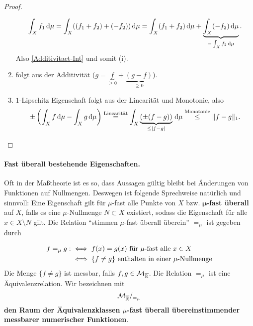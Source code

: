 \begin{satz}
\begin{proof}
\begin{enumerate}
\begin{equation*}
\begin{split}
\int_X f_1 \, \mathrm{d} \mu = \int_X ((f_1+f_2)+(-f_2))\, \mathrm{d}\mu = \int_X (f_1+f_2)\, \mathrm{d}\mu+ \underbrace{\int_X(-f_2)\, \mathrm{d}\mu}_{-\int_X f_2\, \mathrm{d}\mu}.
\end{split}
\end{equation*}
Also \eqref{Additivitaet-Int} und somit (i).
\item folgt aus der Additivität ($g=\underbrace{f}_{\geq 0}+\underbrace{(g-f)}_{\geq 0}$).
\item $1$-Lipschitz Eigenschaft folgt aus der Linearität und Monotonie, also
$$
\pm\left(
\int_Xf\, \mathrm{d}\mu-\int_Xg\, \mathrm{d}\mu
\right) \overset{\text{Linearität}}= \int_X\underbrace{(\pm(f-g))}_{\leq |f-g|}\, \mathrm{d}\mu\overset{\text{Monotonie}}\leq \|f-g\|_1.
$$
\end{enumerate}
\end{proof}
\end{satz}
\paragraph{Fast überall bestehende Eigenschaften.} Oft in der Maßtheorie ist es so, dass Aussagen gültig bleibt bei Änderungen von Funktionen auf Nullmengen. Deswegen ist folgende Sprechweise natürlich und sinnvoll: Eine Eigenschaft gilt für $\mu$-fast alle Punkte von $X$ bzw. $\boldsymbol\mu$\textbf{-fast überall} auf $X$, falls es eine $\mu$-Nullmenge $N\subset X$ existiert, sodass die Eigenschaft für alle $x\in X\setminus N$ gilt. Die Relation ``stimmen $\mu$-fast überall überein'' $=_\mu$ ist gegeben durch

\begin{equation*}
\begin{split}
f =_\mu g : &\iff f(x)=g(x) \  \text{für }\mu \text{-fast alle } x \in X 
\\ &\iff \{f\neq g\} \text{ enthalten in einer } \mu\text{-Nullmenge}
\end{split}
\end{equation*}
Die Menge $\{f\neq g\}$ ist messbar, falls $f,g \in \mathcal{M}_{\overline{\mathbb{R}}}$. Die Relation $=_\mu$ ist eine Äquivalenzrelation. Wir bezeichnen mit $$\mathcal{M}_{\overline{\mathbb{R}}}/_{=_\mu}$$ \textbf{den Raum der Äquivalenzklassen $\mu$-fast überall übereinstimmender messbarer numerischer Funktionen}.

